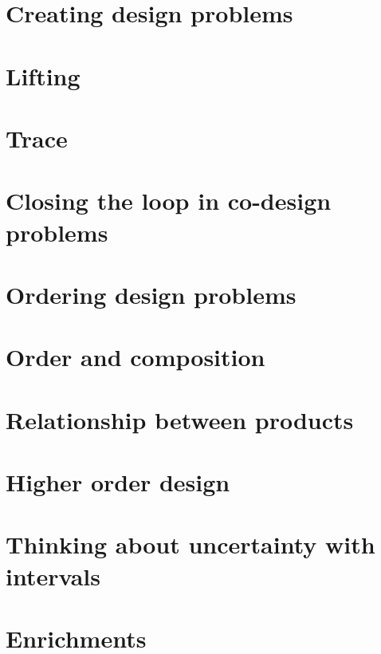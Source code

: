 \documentclass[paper=6in:9in,pagesize=pdftex,
 headinclude=off,footinclude=on,11pt,twoside]{scrbook}
\begin{document}
\chapter{Creating design problems}

\clearpage
%
\chapter{Lifting}

\clearpage
%
\chapter{Trace}

\clearpage
%
\chapter{Closing the loop in co-design problems}

\clearpage
%
\chapter{Ordering design problems}

\clearpage
%
\chapter{Order and composition}

\clearpage
%
\chapter{Relationship between products}

\clearpage
%
\chapter{Higher order design}

\clearpage
%
\chapter{Thinking about uncertainty with intervals}

\clearpage
%
\chapter{Enrichments}

\clearpage


%
%
%
%

\printbibliography
\end{document}
